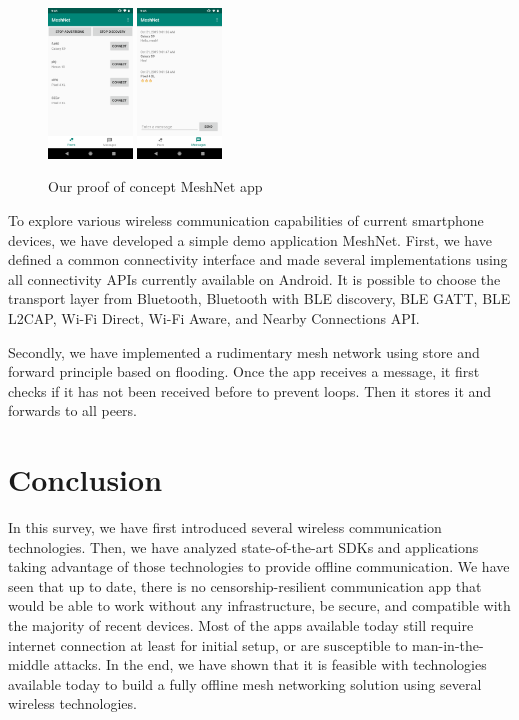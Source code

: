 \documentclass[conference,compsoc]{IEEEtran}
\begin{document}
\begin{figure}[h]
  \centering
  \includegraphics[width=0.2\textwidth]{meshnet1} \includegraphics[width=0.2\textwidth]{meshnet2}
  \caption{Our proof of concept MeshNet app}
\end{figure}


To explore various wireless communication capabilities of current smartphone devices, we have developed a simple demo application MeshNet. First, we have defined a common connectivity interface and made several implementations using all connectivity APIs currently available on Android. It is possible to choose the transport layer from Bluetooth, Bluetooth with BLE discovery, BLE GATT, BLE L2CAP, Wi-Fi Direct, Wi-Fi Aware, and Nearby Connections API.

Secondly, we have implemented a rudimentary mesh network using store and forward principle based on flooding. Once the app receives a message, it first checks if it has not been received before to prevent loops. Then it stores it and forwards to all peers.


\section{Conclusion} \label{conclusion}


In this survey, we have first introduced several wireless communication technologies. Then, we have analyzed state-of-the-art SDKs and applications taking advantage of those technologies to provide offline communication. We have seen that up to date, there is no censorship-resilient communication app that would be able to work without any infrastructure, be secure, and compatible with the majority of recent devices. Most of the apps available today still require internet connection at least for initial setup, or are susceptible to man-in-the-middle attacks.
In the end, we have shown that it is feasible with technologies available today to build a fully offline mesh networking solution using several wireless technologies.
\end{document}
